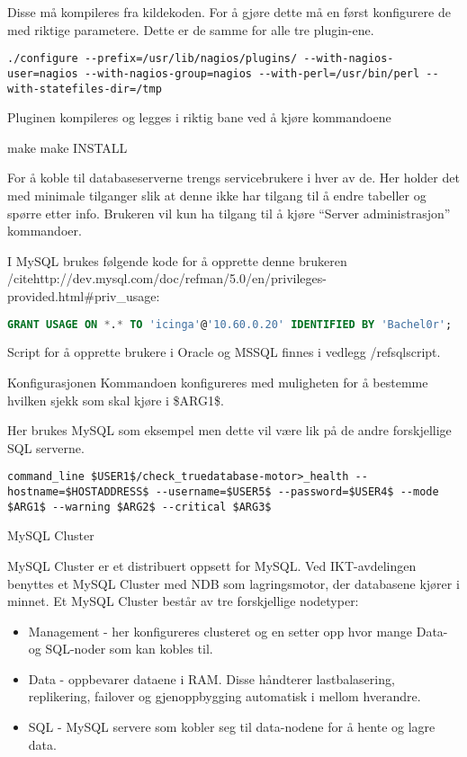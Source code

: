 Disse må kompileres fra kildekoden. For å gjøre dette må en først konfigurere de med riktige parametere. Dette er de samme for alle tre plugin-ene.

\begin{lstlisting}
./configure --prefix=/usr/lib/nagios/plugins/ --with-nagios-user=nagios --with-nagios-group=nagios --with-perl=/usr/bin/perl --with-statefiles-dir=/tmp
\end{lstlisting}

Pluginen kompileres og legges i riktig bane ved å kjøre kommandoene

make
make INSTALL

For å koble til databaseserverne trengs servicebrukere i hver av de. Her holder det med minimale tilganger slik at denne ikke har tilgang til å endre tabeller og spørre etter info. Brukeren vil kun ha tilgang til å kjøre “Server administrasjon” kommandoer.

I MySQL brukes følgende kode for å opprette denne brukeren /cite{http://dev.mysql.com/doc/refman/5.0/en/privileges-provided.html#priv\_usage}:
\begin{lstlisting}[language=SQL]
GRANT USAGE ON *.* TO 'icinga'@'10.60.0.20' IDENTIFIED BY 'Bachel0r'; 
\end{lstlisting}

Script for å opprette brukere i Oracle og MSSQL finnes i vedlegg /ref{sqlscript}.

Konfigurasjonen
Kommandoen konfigureres med muligheten for å bestemme hvilken sjekk som skal kjøre i \$ARG1\$.

Her brukes MySQL som eksempel men dette vil være lik på de andre forskjellige SQL serverne. 
\begin{lstlisting}
command_line $USER1$/check_truedatabase-motor>_health --hostname=$HOSTADDRESS$ --username=$USER5$ --password=$USER4$ --mode $ARG1$ --warning $ARG2$ --critical $ARG3$
\end{lstlisting}
MySQL Cluster

MySQL Cluster er et distribuert oppsett for MySQL. Ved IKT-avdelingen benyttes et MySQL Cluster med NDB som lagringsmotor, der databasene kjører i minnet. Et MySQL Cluster består av tre forskjellige nodetyper:

\begin{itemize}
	\item Management - her konfigureres clusteret og en setter opp hvor mange Data- og SQL-noder som kan kobles til.
	\item Data - oppbevarer dataene i RAM. Disse håndterer lastbalasering, replikering, failover og gjenoppbygging automatisk i mellom hverandre.
	\item SQL - MySQL servere som kobler seg til data-nodene for å hente og lagre data.
\end{itemize}

